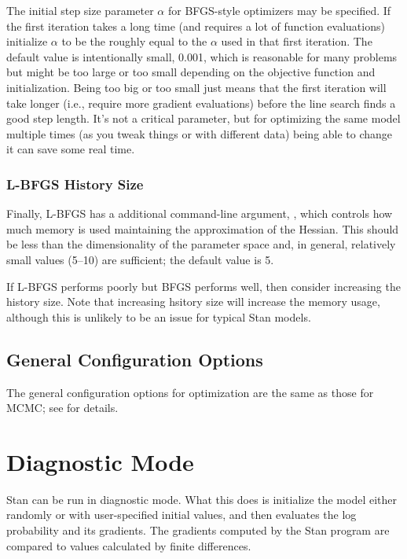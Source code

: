 The initial step size parameter $\alpha$ for BFGS-style optimizers may
be specified. If the first iteration takes a long time (and requires a
lot of function evaluations) initialize $\alpha$ to be the roughly
equal to the $\alpha$ used in that first iteration. The default value
is intentionally small, 0.001, which is reasonable for many problems
but might be too large or too small depending on the objective
function and initialization. Being too big or too small just means
that the first iteration will take longer (i.e., require more gradient
evaluations) before the line search finds a good step length. It's not
a critical parameter, but for optimizing the same model multiple times
(as you tweak things or with different data) being able to change it
can save some real time.

\subsection{L-BFGS History Size}

Finally, L-BFGS has a additional command-line argument, ,
which controls how much memory is used maintaining the approximation of
the Hessian.  This should be less than the dimensionality of the parameter
space and, in general, relatively small values (5--10) are sufficient;
the default value is 5.

If L-BFGS performs poorly but BFGS performs well, then consider
increasing the history size. Note that increasing hsitory size will
increase the memory usage, although this is unlikely to be an issue
for typical Stan models.


\section{General Configuration Options}

The general configuration options for optimization are the same as
those for MCMC;  see  for details.


\chapter{Diagnostic Mode}\label{diagnostic-algorithms.chapter}


\noindent
Stan can be run in diagnostic mode.  What this does is initialize the
model either randomly or with user-specified initial values, and then
evaluates the log probability and its gradients.  The gradients
computed by the Stan program are compared to values calculated by
finite differences.  

